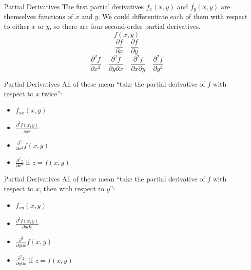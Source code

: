 \documentclass[aspectratio=169]{beamer}
\begin{document}
\begin{frame}{Partial Derivatives}\label{main1}
    The first partial derivatives $f_x(x, y)$ and $f_y(x, y)$ are themselves functions of $x$ and $y$. We could differentiate each of them with respect to either $x$ or $y$, so there are four second-order partial derivatives.
    \[
    f(x, y)
    \]
    \[
    \frac{\partial f}{\partial x} \quad \frac{\partial f}{\partial y}
    \]
    \[
    \frac{\partial^2 f}{\partial x^2} \quad \frac{\partial^2 f}{\partial y \partial x} \quad \frac{\partial^2 f}{\partial x \partial y} \quad \frac{\partial^2 f}{\partial y^2}
    \]

\end{frame}

\begin{frame}{Partial Derivatives}\label{main1}
    All of these mean “take the partial derivative of $f$ with respect to $x$ twice”:
    \begin{itemize}
        \item $f_{xx}(x, y)$
        \item $\frac{\partial^2 f(x, y)}{\partial x^2}$
        \item $\frac{\partial^2}{\partial x^2} f(x, y)$
        \item $\frac{\partial^2 z}{\partial x^2}$ if $z = f(x, y)$
    \end{itemize}
\end{frame}

\begin{frame}{Partial Derivatives}\label{main1}
    All of these mean “take the partial derivative of $f$ with respect to $x$, then with respect to $y$”:
    \begin{itemize}
        \item $f_{xy}(x, y)$
        \item $\frac{\partial^2 f(x, y)}{\partial y \partial x}$
        \item $\frac{\partial^2}{\partial y \partial x} f(x, y)$
        \item $\frac{\partial^2 z}{\partial y \partial x}$ if $z = f(x, y)$
    \end{itemize}
\end{frame}
\end{document}
